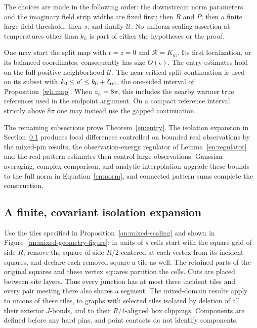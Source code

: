 \begin{theorem}
The choices are made in the following order: the downstream norm
parameters and the imaginary field strip widths are fixed first;
then $R$ and $P$; then a finite large-field threshold; then $s$; and
finally $\mathcal U$.  No uniform scaling assertion at temperatures
other than $k_h$ is part of either the hypotheses or the proof.
\end{theorem}

One may start the split map with $t=z=0$ and $\mathcal R=K_m$.
Its first localization, or its balanced coordinates, consequently has
size $O(\epsilon)$.  The entry estimates hold on the full positive
neighborhood $\mathcal U$.  The near-critical split continuation is
used on its subset with
$k_0\le a'\le k_0+\delta_{\rm ref}$, the one-sided interval of
Proposition~\ref{wh:map}.  When $a_h=8\pi$, this includes the nearby
warmer true references used in the endpoint argument.  On a compact
reference interval strictly above $8\pi$ one may instead use the
gapped continuation.

The remaining subsections prove Theorem~\ref{en:entry}.
The isolation expansion in Section~\ref{en:patches} produces local
differences controlled on bounded real observations by the mixed-pin
results; the observation-energy regulator of Lemma~\ref{en:regulator}
and the real pattern estimates then control large observations.
Gaussian averaging, complex comparison, and analytic interpolation
upgrade these bounds to the full norm in Equation~\eqref{en:norm},
and connected pattern sums complete the construction.

\subsection{A finite, covariant isolation expansion}\label{en:patches}

Use the tiles specified in Proposition~\ref{an:mixed-scaling} and shown in
Figure~\ref{an:mixed-geometry-figure}: in units of
$s$ cells start with the square grid of side $R$, remove the square
of side $R/2$ centered at each vertex from its incident squares, and
declare each removed square a tile as well.  The retained parts of the
original squares and these vertex squares partition the cells.  Cuts
are placed between site layers.  Thus every junction has at most three
incident tiles and every pair meeting there also shares a segment.
The mixed-domain results apply to unions of these tiles, to graphs with
selected tiles isolated by deletion of all their exterior $J$-bonds,
and to their $R/4$-aligned box clippings.  Components are defined before
any hard pins, and point contacts do not identify components.

